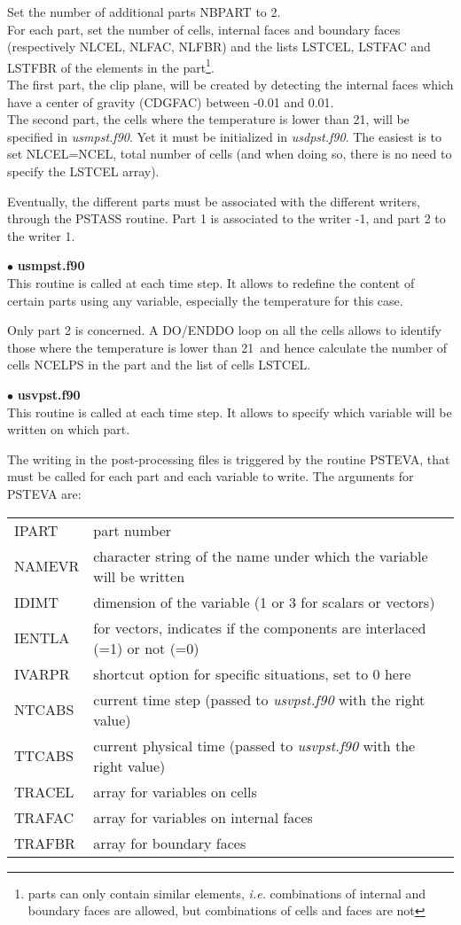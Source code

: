 Set the number of additional parts NBPART to 2.\\
For each part, set the number of cells, internal faces and boundary faces
(respectively NLCEL, NLFAC, NLFBR) and the lists LSTCEL, LSTFAC and LSTFBR of
the elements in the part\footnote{parts can only contain similar elements,
{\em i.e.} combinations of internal and boundary faces are allowed, but
combinations of cells and faces are not}.\\
The first part, the clip plane, will be created by detecting the internal faces
which have a center of gravity (CDGFAC) between -0.01 and 0.01.\\
The second part, the cells where the temperature is lower than 21\degresC, will
be specified in {\itshape usmpst.f90}. Yet it must be initialized in
{\itshape usdpst.f90}. The easiest is to set \mbox{NLCEL=NCEL}, total number of
cells (and when doing so, there is no need to specify the LSTCEL array).

Eventually, the different parts must be associated with the different writers,
through the PSTASS routine. Part 1 is associated to the writer -1, and part 2 to
the writer 1.


$\bullet$ {\bfseries usmpst.f90}\\
This routine is called at each time step. It allows to redefine the content of
certain parts using any variable, especially the temperature for this case.

Only part 2 is concerned. A DO/ENDDO loop on all the cells allows to identify those
where the temperature is lower than 21\degresC\ and hence calculate the number
of cells NCELPS in the part and the list of cells LSTCEL.


$\bullet$ {\bfseries usvpst.f90}\\
This routine is called at each time step. It allows to specify which variable
will be written on which part.

The writing in the post-processing files is triggered by the routine PSTEVA,
that must be called for each part and each variable to write. The arguments for
PSTEVA are:

\begin{tabular}{@{$\bullet\ $}l@{$\quad$}p{10cm}}
IPART & part number\\
NAMEVR & character string of the name under which the variable will be written\\
IDIMT & dimension of the variable (1 or 3 for scalars or vectors)\\
IENTLA & for vectors, indicates if the components are interlaced (=1) or not
(=0)\\
IVARPR & shortcut option for specific situations, set to 0 here\\
NTCABS & current time step (passed to {\itshape usvpst.f90} with the right value)\\
TTCABS & current physical time (passed to {\itshape usvpst.f90} with the right
value)\\
TRACEL & array for variables on cells\\
TRAFAC & array for variables on internal faces\\
TRAFBR & array for boundary faces
\end{tabular}


